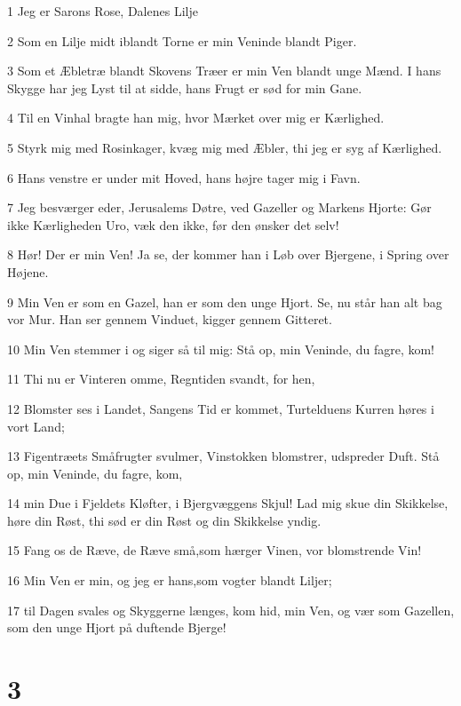 \par 1 Jeg er Sarons Rose, Dalenes Lilje
\par 2 Som en Lilje midt iblandt Torne er min Veninde blandt Piger.
\par 3 Som et Æbletræ blandt Skovens Træer er min Ven blandt unge Mænd. I hans Skygge har jeg Lyst til at sidde, hans Frugt er sød for min Gane.
\par 4 Til en Vinhal bragte han mig, hvor Mærket over mig er Kærlighed.
\par 5 Styrk mig med Rosinkager, kvæg mig med Æbler, thi jeg er syg af Kærlighed.
\par 6 Hans venstre er under mit Hoved, hans højre tager mig i Favn.
\par 7 Jeg besværger eder, Jerusalems Døtre, ved Gazeller og Markens Hjorte: Gør ikke Kærligheden Uro, væk den ikke, før den ønsker det selv!
\par 8 Hør! Der er min Ven! Ja se, der kommer han i Løb over Bjergene, i Spring over Højene.
\par 9 Min Ven er som en Gazel, han er som den unge Hjort. Se, nu står han alt bag vor Mur. Han ser gennem Vinduet, kigger gennem Gitteret.
\par 10 Min Ven stemmer i og siger så til mig: Stå op, min Veninde, du fagre, kom!
\par 11 Thi nu er Vinteren omme, Regntiden svandt, for hen,
\par 12 Blomster ses i Landet, Sangens Tid er kommet, Turtelduens Kurren høres i vort Land;
\par 13 Figentræets Småfrugter svulmer, Vinstokken blomstrer, udspreder Duft. Stå op, min Veninde, du fagre, kom,
\par 14 min Due i Fjeldets Kløfter, i Bjergvæggens Skjul! Lad mig skue din Skikkelse, høre din Røst, thi sød er din Røst og din Skikkelse yndig.
\par 15 Fang os de Ræve, de Ræve små,som hærger Vinen, vor blomstrende Vin!
\par 16 Min Ven er min, og jeg er hans,som vogter blandt Liljer;
\par 17 til Dagen svales og Skyggerne længes, kom hid, min Ven, og vær som Gazellen, som den unge Hjort på duftende Bjerge!

\chapter{3}

